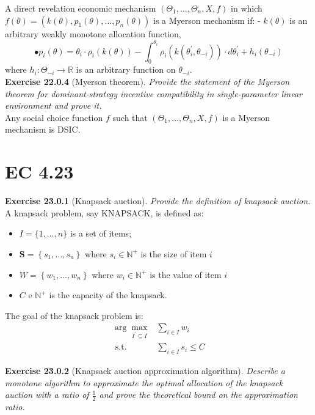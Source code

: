 A direct revelation economic mechanism $\left(\Theta_{1}, \ldots, \Theta_{n}, X, f\right)$ in which $f(\theta)=\left(k(\theta), p_{1}(\theta), \ldots, p_{n}(\theta)\right)$ is a Myerson mechanism if:
- $k(\theta)$ is an arbitrary weakly monotone allocation function,
$$
\bullet p_{i}(\theta)=\theta_{i} \cdot \rho_{i}(k(\theta))-\int_{0}^{\theta_{i}} \rho_{i}\left(k\left(\theta_{i}^{\prime}, \theta_{-i}\right)\right) \cdot d \theta_{i}^{\prime}+h_{i}\left(\theta_{-i}\right)
$$
where $h_{i}: \Theta_{-i} \rightarrow \mathbb{R}$ is an arbitrary function on $\theta_{-i}$.\\

\textbf{Exercise 22.0.4} (Myerson theorem). \textit{Provide the statement of the Myerson theorem for dominant-strategy incentive compatibility in single-parameter linear environment and prove it.}\\

Any social choice function $f$ such that $\left(\Theta_{1}, \ldots, \Theta_{n}, X, f\right)$ is a Myerson mechanism is DSIC.

\section{EC 4.23}

\textbf{Exercise 23.0.1} (Knapsack auction). \textit{Provide the definition of knapsack auction.}\\

A knapsack problem, say KNAPSACK, is defined as:
\begin{itemize}
\item $I=\{1, \ldots, n\}$ is a set of items;
\item $\boldsymbol{S}=\left\{s_{1}, \ldots, s_{n}\right\}$ where $s_{i} \in \mathbb{N}^{+}$ is the size of item $i$
\item $W=\left\{w_{1}, \ldots, w_{n}\right\}$ where $w_{i} \in \mathbb{N}^{+}$ is the value of item $i$
\item $C$ e $\mathbb{N}^{+}$ is the capacity of the knapsack. 
\end{itemize}
The goal of the knapsack problem is:
$$
\begin{aligned}
\arg \max _{I^{\prime} \subseteq I} & \sum_{i \in I} w_{i} \\
\text { s.t. } & \sum_{i \in I} s_{i} \leqslant C
\end{aligned}
$$

\textbf{Exercise 23.0.2} (Knapsack auction approximation algorithm). \textit{Describe a monotone algorithm to approximate the optimal allocation of the knapsack auction with a ratio of $\frac{1}{2}$ and prove the theoretical bound on the approximation ratio.}\\

